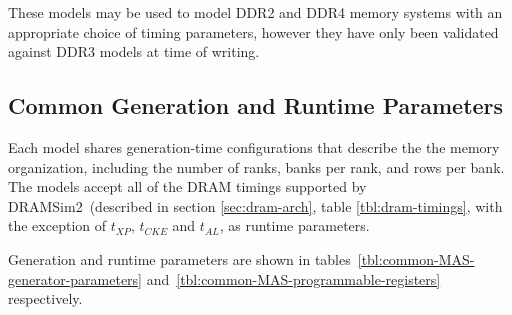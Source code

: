 These models may be used to model DDR2 and DDR4 memory systems with an
appropriate choice of timing parameters, however they have only been validated
against DDR3 models at time of writing.

\subsection{Common Generation and Runtime Parameters}

Each model shares generation-time configurations that describe the
the memory organization, including the number of ranks,
banks per rank, and rows per bank. The models accept all of the DRAM timings supported by DRAMSim2~(described in
section \ref{sec:dram-arch}, table \ref{tbl:dram-timings}, with the exception
of $t_{XP}$, $t_{CKE}$ and $t_{AL}$, as runtime parameters.

\noindent Generation and runtime parameters are shown in
tables~\ref{tbl:common-MAS-generator-parameters}
and~\ref{tbl:common-MAS-programmable-registers}
respectively.

\begin{table}[htb]
\begin{center}
\end{center}
\caption{Common generation parameters of the DDR3 MAS models.}
\label{tbl:common-MAS-generator-parameters}
\end{table}%

